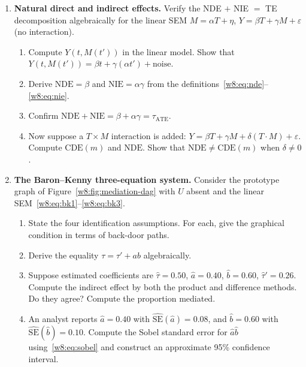 \documentclass[master.tex]{subfiles}
\begin{document}
\begin{enumerate}[label=\textbf{\arabic*.}, leftmargin=*, itemsep=10pt]
  \item \textbf{Natural direct and indirect effects.}
  Verify the NDE $+$ NIE $=$ TE decomposition algebraically for
  the linear SEM $M = \alpha T + \eta$,
  $Y = \beta T + \gamma M + \varepsilon$ (no interaction).
  \begin{enumerate}[label=(\alph*)]
    \item Compute $Y(t, M(t'))$ in the linear model.  Show that
      $Y(t, M(t')) = \beta t + \gamma(\alpha t') + \text{noise}$.
    \item Derive $\mathrm{NDE} = \beta$ and $\mathrm{NIE} = \alpha\gamma$
      from the definitions~\eqref{w8:eq:nde}--\eqref{w8:eq:nie}.
    \item Confirm $\mathrm{NDE} + \mathrm{NIE} = \beta + \alpha\gamma
      = \tau_{\mathrm{ATE}}$.
    \item Now suppose a $T \times M$ interaction is added:
      $Y = \beta T + \gamma M + \delta (T \cdot M) + \varepsilon$.
      Compute $\mathrm{CDE}(m)$ and $\mathrm{NDE}$.  Show that
      $\mathrm{NDE} \neq \mathrm{CDE}(m)$ when $\delta \neq 0$.
  \end{enumerate}

  \item \textbf{The Baron--Kenny three-equation system.}
  Consider the prototype graph of Figure~\ref{w8:fig:mediation-dag}
  with $U$ absent and the linear
  SEM~\eqref{w8:eq:bk1}--\eqref{w8:eq:bk3}.
  \begin{enumerate}[label=(\alph*)]
    \item State the four identification assumptions.  For each, give the
      graphical condition in terms of back-door paths.
    \item Derive the equality $\tau = \tau' + ab$ algebraically.
    \item Suppose estimated coefficients are $\hat\tau = 0.50$,
      $\hat a = 0.40$, $\hat b = 0.60$, $\hat\tau' = 0.26$.  Compute
      the indirect effect by both the product and difference methods.
      Do they agree?  Compute the proportion mediated.
    \item An analyst reports $\hat a = 0.40$ with
      $\widehat{\mathrm{SE}}(\hat a) = 0.08$, and $\hat b = 0.60$
      with $\widehat{\mathrm{SE}}(\hat b) = 0.10$.  Compute the Sobel
      standard error for $\hat a \hat b$ using~\eqref{w8:eq:sobel}
      and construct an approximate 95\% confidence interval.
  \end{enumerate}


\end{enumerate}
\end{document}
